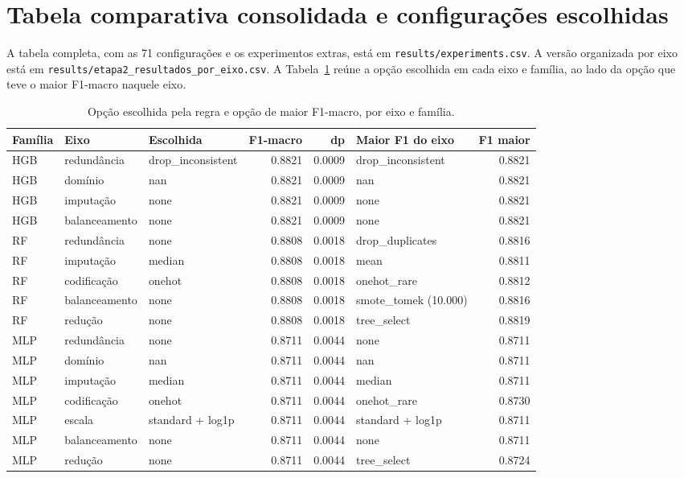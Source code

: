 \documentclass[11pt,a4paper]{article}
\begin{document}
\section{Tabela comparativa consolidada e configurações escolhidas}

A tabela completa, com as 71 configurações e os experimentos extras, está em \texttt{results/experiments.csv}. A versão organizada por eixo está em \texttt{results/etapa2\_resultados\_por\_eixo.csv}. A Tabela~\ref{tab:resumo} reúne a opção escolhida em cada eixo e família, ao lado da opção que teve o maior F1-macro naquele eixo.

\begin{table}[H]
\centering
\caption{Opção escolhida pela regra e opção de maior F1-macro, por eixo e família.}
\label{tab:resumo}
\begin{adjustbox}{max width=\linewidth}
\begin{tabular}{lllrrlr}
\toprule
Família & Eixo & Escolhida & F1-macro & dp & Maior F1 do eixo & F1 maior \\
\midrule
HGB & redundância & drop\_inconsistent & 0.8821 & 0.0009 & drop\_inconsistent & 0.8821 \\
HGB & domínio & nan & 0.8821 & 0.0009 & nan & 0.8821 \\
HGB & imputação & none & 0.8821 & 0.0009 & none & 0.8821 \\
HGB & balanceamento & none & 0.8821 & 0.0009 & none & 0.8821 \\
\midrule
RF & redundância & none & 0.8808 & 0.0018 & drop\_duplicates & 0.8816 \\
RF & imputação & median & 0.8808 & 0.0018 & mean & 0.8811 \\
RF & codificação & onehot & 0.8808 & 0.0018 & onehot\_rare & 0.8812 \\
RF & balanceamento & none & 0.8808 & 0.0018 & smote\_tomek (10.000) & 0.8816 \\
RF & redução & none & 0.8808 & 0.0018 & tree\_select & 0.8819 \\
\midrule
MLP & redundância & none & 0.8711 & 0.0044 & none & 0.8711 \\
MLP & domínio & nan & 0.8711 & 0.0044 & nan & 0.8711 \\
MLP & imputação & median & 0.8711 & 0.0044 & median & 0.8711 \\
MLP & codificação & onehot & 0.8711 & 0.0044 & onehot\_rare & 0.8730 \\
MLP & escala & standard + log1p & 0.8711 & 0.0044 & standard + log1p & 0.8711 \\
MLP & balanceamento & none & 0.8711 & 0.0044 & none & 0.8711 \\
MLP & redução & none & 0.8711 & 0.0044 & tree\_select & 0.8724 \\
\bottomrule
\end{tabular}
\end{adjustbox}
\end{table}
\end{document}
